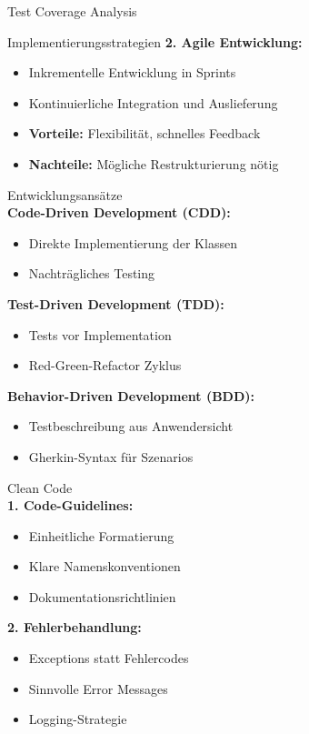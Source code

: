 \begin{example2}{Test Coverage Analysis}
\begin{concept}{Implementierungsstrategien}
\textbf{2. Agile Entwicklung:}
\begin{itemize}
    \item Inkrementelle Entwicklung in Sprints
    \item Kontinuierliche Integration und Auslieferung
    \item \textbf{Vorteile:} Flexibilität, schnelles Feedback
    \item \textbf{Nachteile:} Mögliche Restrukturierung nötig
\end{itemize}
\end{concept}

\begin{definition}{Entwicklungsansätze}\\
\textbf{Code-Driven Development (CDD):}
\begin{itemize}
    \item Direkte Implementierung der Klassen
    \item Nachträgliches Testing
\end{itemize}

\textbf{Test-Driven Development (TDD):}
\begin{itemize}
    \item Tests vor Implementation
    \item Red-Green-Refactor Zyklus
\end{itemize}

\textbf{Behavior-Driven Development (BDD):}
\begin{itemize}
    \item Testbeschreibung aus Anwendersicht
    \item Gherkin-Syntax für Szenarios
\end{itemize}
\end{definition}

\begin{KR}{Clean Code}\\
\textbf{1. Code-Guidelines:}
\begin{itemize}
    \item Einheitliche Formatierung
    \item Klare Namenskonventionen
    \item Dokumentationsrichtlinien
\end{itemize}

\textbf{2. Fehlerbehandlung:}
\begin{itemize}
    \item Exceptions statt Fehlercodes
    \item Sinnvolle Error Messages
    \item Logging-Strategie
\end{itemize}


\end{KR}
\end{example2}
